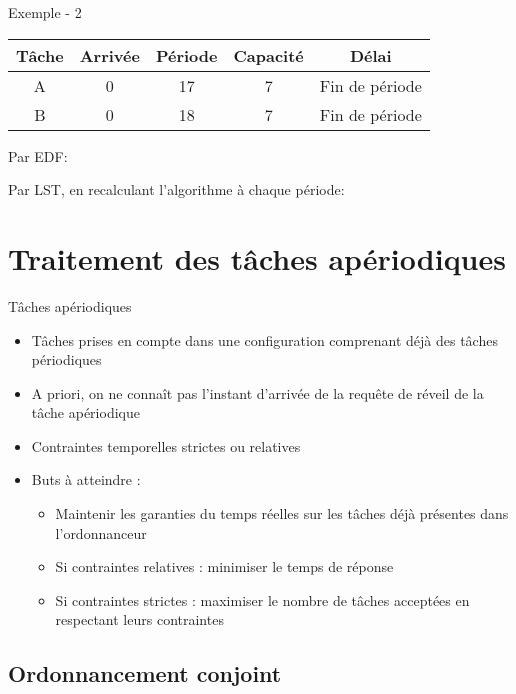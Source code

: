 \begin{frame}{Exemple - 2}
  \begin{center}
    \begin{tabular}{ccccc}
      \hline
      Tâche & Arrivée & Période & Capacité & Délai \\
      \hline
      A & 0 & 17 & 7 & Fin de période\\
      B & 0 & 18 & 7 & Fin de période\\
      \hline
    \end{tabular}
  \end{center}
  Par EDF:
  \pause
  \begin{center}
    
  \end{center}
  Par LST, en recalculant l'algorithme à chaque période:
  \pause
  \begin{center}
    
  \end{center}
\end{frame}

\section{Traitement des tâches apériodiques}

\begin{frame}{Tâches apériodiques}
  \begin{itemize}
  \item Tâches prises en compte dans une configuration comprenant déjà
    des tâches périodiques
  \item A priori, on ne  connaît pas l'instant d'arrivée de la requête
    de réveil de la tâche apériodique
  \item Contraintes temporelles strictes ou relatives
  \item Buts à atteindre :
    \begin{itemize}
    \item Maintenir les garanties du temps réelles sur les tâches déjà
      présentes dans l'ordonnanceur
    \item Si contraintes relatives : minimiser le temps de réponse
    \item  Si contraintes  strictes :  maximiser le  nombre  de tâches
      acceptées en respectant leurs contraintes
    \end{itemize}
  \end{itemize}
\end{frame}

\subsection{Ordonnancement conjoint}

